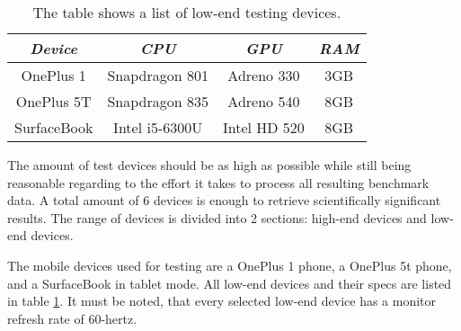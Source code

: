 \begin{table}
  \centering
  \begin{threeparttable}
    \caption{The table shows a list of low-end testing devices.}
    \label{tab:lowendTestingDevices}
    \centering
    \def\rr{\rightskip=0pt plus1em \spaceskip=.3333em \xspaceskip=.5em\relax}
    \setlength{\tabcolsep}{1ex}
    \def\arraystretch{1.20}
    \setlength{\tabcolsep}{1ex}
    \small
    \begin{english}
      \begin{tabular}{|c||c|c|c|}
        \hline
          \multicolumn{1}{|c||}{\emph{Device}}&
          \multicolumn{1}{|c}{\emph{CPU}} &
          \multicolumn{1}{|c}{\emph{GPU}} &
          \multicolumn{1}{|c|}{\emph{RAM}} \\
        \hline
        \hline
        OnePlus 1 & 
        Snapdragon 801 & 
        Adreno 330 & 
        3GB \\
        \hline
        OnePlus 5T & 
        Snapdragon 835 & 
        Adreno 540  & 
        8GB \\
        \hline
        SurfaceBook & 
        Intel i5-6300U & 
        Intel HD 520 & 
        8GB \\
        \hline
      \end{tabular}  
    \end{english}
  \end{threeparttable}
\end{table}

The amount of test devices should be as high as possible while still being reasonable regarding to the effort it takes to process all resulting benchmark data. A total amount of 6 devices is enough to retrieve scientifically significant results. The range of devices is divided into 2 sections: high-end devices and low-end devices. 

The mobile devices used for testing are a OnePlus 1 phone, a OnePlus 5t phone, and a SurfaceBook in tablet mode. All low-end devices and their specs are listed in table \ref{tab:lowendTestingDevices}. It must be noted, that every selected low-end device has a monitor refresh rate of 60-hertz. 

